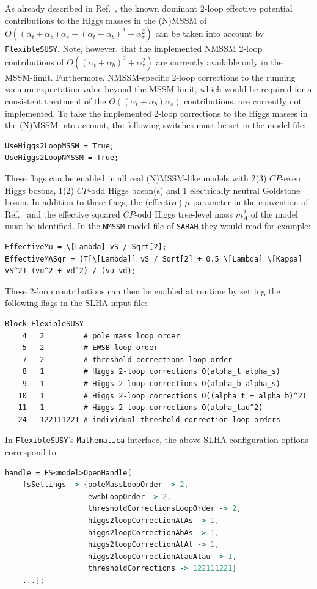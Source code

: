 \documentclass[final,3p,11pt,pdflatex]{elsarticle}
\makeatletter
\newcommand{\modelname}[1]{\texttt{#1}\@\xspace}
\newcommand{\sarah}{\texttt{SARAH}\@\xspace}
\newcommand{\fs}{\texttt{FlexibleSUSY}\@\xspace}
\newcommand{\mathematica}{\texttt{Ma\-the\-ma\-ti\-ca}\xspace}
\newcommand{\CP}{\ensuremath{CP}\xspace}
\def\at{\alpha_t}
\def\ab{\alpha_b}
\def\as{\alpha_s}
\def\atau{\alpha_{\tau}}
\makeatother
\begin{document}
As already described in Ref.~\cite{Athron:2014yba}, the known dominant 2-loop
effective potential contributions to the Higgs masses in the (N)MSSM
of $O((\at + \ab)\as + (\at +
\ab)^2 + \atau^2)$
\cite{Degrassi:2001yf,Brignole:2001jy,Dedes:2002dy,Brignole:2002bz,Dedes:2003km,Degrassi:2009yq}
can be taken into account by \fs.
%
Note, however, that the implemented NMSSM 2-loop contributions of
$O((\at + \ab)^2 + \atau^2)$ are currently available only in the
MSSM-limit.  Furthermore, NMSSM-specific 2-loop corrections to the
running vacuum expectation value beyond the MSSM limit, which would be
required for a consistent treatment of the $O((\at + \ab)\as)$
contributions, are currently not implemented.
%
To take the implemented 2-loop corrections to the Higgs masses in the
(N)MSSM into account, the following switches must be set in the model
file:
%
\begin{lstlisting}
UseHiggs2LoopMSSM = True;
UseHiggs2LoopNMSSM = True;
\end{lstlisting}
%
These flags can be enabled in all real (N)MSSM-like models with 2(3)
\CP-even Higgs bosons, 1(2) \CP-odd Higgs boson(s) and 1 electrically neutral
Goldstone boson.  In addition to these flags, the (effective) $\mu$
parameter in the convention of Ref.~\cite{Haber:1984rc} and the effective
squared \CP-odd Higgs tree-level mass $m_A^2$ of the model must be identified.
In the \modelname{NMSSM} model file of \sarah they would read for
example:
%
\begin{lstlisting}
EffectiveMu = \[Lambda] vS / Sqrt[2];
EffectiveMASqr = (T[\[Lambda]] vS / Sqrt[2] + 0.5 \[Lambda] \[Kappa] vS^2) (vu^2 + vd^2) / (vu vd);
\end{lstlisting}
%
These 2-loop contributions can then be enabled at runtime by setting
the following flags in the SLHA input file:
%
\begin{lstlisting}
Block FlexibleSUSY
    4   2         # pole mass loop order
    5   2         # EWSB loop order
    7   2         # threshold corrections loop order
    8   1         # Higgs 2-loop corrections O(alpha_t alpha_s)
    9   1         # Higgs 2-loop corrections O(alpha_b alpha_s)
   10   1         # Higgs 2-loop corrections O((alpha_t + alpha_b)^2)
   11   1         # Higgs 2-loop corrections O(alpha_tau^2)
   24   122111221 # individual threshold correction loop orders
\end{lstlisting}
%
In \fs's \mathematica interface, the above SLHA configuration options
correspond to
%
\begin{lstlisting}[language=Mathematica]
handle = FS<model>OpenHandle[
    fsSettings -> {poleMassLoopOrder -> 2,
                   ewsbLoopOrder -> 2,
                   thresholdCorrectionsLoopOrder -> 2,
                   higgs2loopCorrectionAtAs -> 1,
                   higgs2loopCorrectionAbAs -> 1,
                   higgs2loopCorrectionAtAt -> 1,
                   higgs2loopCorrectionAtauAtau -> 1,
                   thresholdCorrections -> 122111221}
    ...];
\end{lstlisting}
\end{document}
